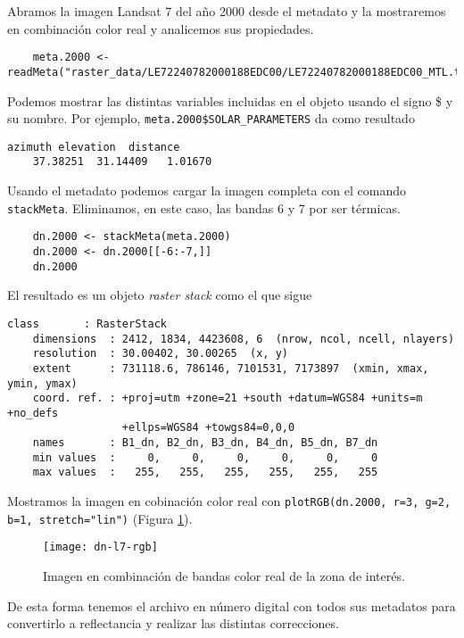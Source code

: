 \begin{exa}
    Abramos  la imagen Landsat 7
    del año 2000 desde el metadato y la mostraremos en combinaci\'on color real
    y analicemos sus propiedades.
    \begin{lstlisting}
    meta.2000 <- readMeta("raster_data/LE72240782000188EDC00/LE72240782000188EDC00_MTL.txt")
    \end{lstlisting}
    Podemos mostrar las distintas variables incluidas en el objeto usando el
    signo \$ y su nombre. Por ejemplo, \verb|meta.2000$SOLAR_PARAMETERS|
    da como resultado
    \begin{Verbatim}[fontsize=\small]
     azimuth elevation  distance
    37.38251  31.14409   1.01670
    \end{Verbatim}
    Usando el metadato podemos cargar la imagen completa con el comando
    \texttt{stackMeta}. Eliminamos, en este caso, las bandas 6 y 7 por
    ser t\'ermicas.
    \begin{lstlisting}
    dn.2000 <- stackMeta(meta.2000)
    dn.2000 <- dn.2000[[-6:-7,]]
    dn.2000
    \end{lstlisting}
    El resultado es un objeto \emph{raster stack} como el que sigue
    \begin{Verbatim}[fontsize=\small]
    class       : RasterStack
    dimensions  : 2412, 1834, 4423608, 6  (nrow, ncol, ncell, nlayers)
    resolution  : 30.00402, 30.00265  (x, y)
    extent      : 731118.6, 786146, 7101531, 7173897  (xmin, xmax, ymin, ymax)
    coord. ref. : +proj=utm +zone=21 +south +datum=WGS84 +units=m +no_defs
                  +ellps=WGS84 +towgs84=0,0,0
    names       : B1_dn, B2_dn, B3_dn, B4_dn, B5_dn, B7_dn
    min values  :     0,     0,     0,     0,     0,     0
    max values  :   255,   255,   255,   255,   255,   255
    \end{Verbatim}
    Mostramos la imagen en cobinaci\'on color real con \texttt{plotRGB(dn.2000, r=3, g=2, b=1, stretch="lin")}
    (Figura \ref{fig:dn-l7-rgb}).
     \begin{figure}[h!]
     \begin{center}
         \texttt{[image: dn-l7-rgb]}
     \end{center}
     \caption{Imagen en combinaci\'on de bandas color real de la zona de inter\'es.}
     \label{fig:dn-l7-rgb}
     \end{figure}
\end{exa}

De esta forma tenemos el archivo en n\'umero digital con todos sus metadatos
para convertirlo a reflectancia y realizar las distintas correcciones.

